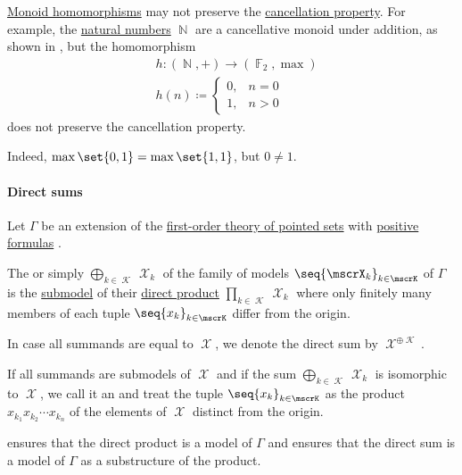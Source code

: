 \begin{example}\label{ex:monoid_cancellation_not_preserved_by_homomorphism}
  \hyperref[def:monoid/homomorphism]{Monoid homomorphisms} may not preserve the \hyperref[def:binary_operation/cancellative]{cancellation property}. For example, the \hyperref[def:natural_numbers]{natural numbers} \( \BbbN \) are a cancellative monoid under addition, as shown in , but the homomorphism
  \begin{equation*}
    \begin{aligned}
      &h: (\BbbN, +) \to (\BbbF_2, \max) \\
      &h(n) \coloneqq \begin{cases}
        0, &n = 0 \\
        1, &n > 0
      \end{cases}
    \end{aligned}
  \end{equation*}
  does not preserve the cancellation property.

  Indeed, \( \max\set{ 0, 1 } = \max\set{ 1, 1 } \), but \( 0 \neq 1 \).
\end{example}

\paragraph{Direct sums}

\begin{definition}\label{def:direct_sum}\mimprovised
  Let \( \Gamma \) be an extension of the \hyperref[def:pointed_set/theory]{first-order theory of pointed sets} with \hyperref[def:positive_formula]{positive formulas} .

  The  or simply  \( \bigoplus_{k \in \mscrK} \mscrX_k \) of the family of models \( \seq{ \mscrX_k }_{k \in \mscrK} \) of \( \Gamma \) is the \hyperref[def:first_order_submodel]{submodel} of their \hyperref[def:first_order_direct_product]{direct product} \( \prod_{k \in \mscrK} \mscrX_k \) where only finitely many members of each tuple \( \seq{ x_k }_{k \in \mscrK} \) differ from the origin.

  In case all summands are equal to \( \mscrX \), we denote the direct sum by \( \mscrX^{\oplus \mscrK} \).

  If all summands are submodels of \( \mscrX \) and if the sum \( \bigoplus_{k \in \mscrK} \mscrX_k \) is isomorphic to \( \mscrX \), we call it an  and treat the tuple \( \seq{ x_k }_{k \in \mscrK} \) as the product \( x_{k_1} x_{k_2} \cdots x_{k_n} \) of the elements of \( \mscrX \) distinct from the origin.
\end{definition}
\begin{defproof}
   ensures that the direct product is a model of \( \Gamma \) and  ensures that the direct sum is a model of \( \Gamma \) as a substructure of the product.
\end{defproof}

